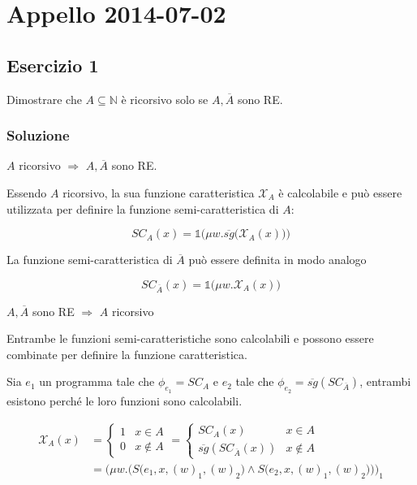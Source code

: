 \section{Appello 2014-07-02}

\subsection{Esercizio 1}

Dimostrare che $A \subseteq \mathbb{N}$ è ricorsivo solo se $A, \overline{A}$ sono RE.

\subsubsection{Soluzione}

$A$ ricorsivo $\Rightarrow$ $A, \overline{A}$ sono RE.

Essendo $A$ ricorsivo, la sua funzione caratteristica $\mathcal{X}_A$ è calcolabile e può essere utilizzata per definire la funzione semi-caratteristica di $A$:

$$
SC_A(x) = \mathbb{1}\Big( \mu w . \overline{sg}\big(\mathcal{X}_A(x)\big) \Big)
$$

La funzione semi-caratteristica di $\overline{A}$ può essere definita in modo analogo

$$
SC_{\overline{A}}(x) = \mathbb{1}\Big( \mu w . \mathcal{X}_A(x) \Big)
$$

$A, \overline{A}$ sono RE $\Rightarrow$ $A$ ricorsivo 

Entrambe le funzioni semi-caratteristiche sono calcolabili e possono essere combinate per definire la funzione caratteristica.

Sia $e_1$ un programma tale che $\phi_{e_1} = SC_A$ e $e_2$ tale che $\phi_{e_2} = \overline{sg}(SC_{\overline{A}})$, entrambi esistono perché le loro funzioni sono calcolabili.

\begin{align*}
\mathcal{X}_A(x) &= \begin{cases}
1 & x \in A \\
0 & x \notin A
\end{cases} = \begin{cases}
SC_A(x) & x \in A \\
\overline{sg}(SC_{\overline{A}}(x)) & x \notin A
\end{cases}   \\
&= \Bigg( \mu w . \bigg(  S\Big(e_1, x,  (w)_1, (w)_2\Big) \wedge S\Big(e_2, x,  (w)_1, (w)_2\Big) \bigg) \Bigg)_1
\end{align*}

